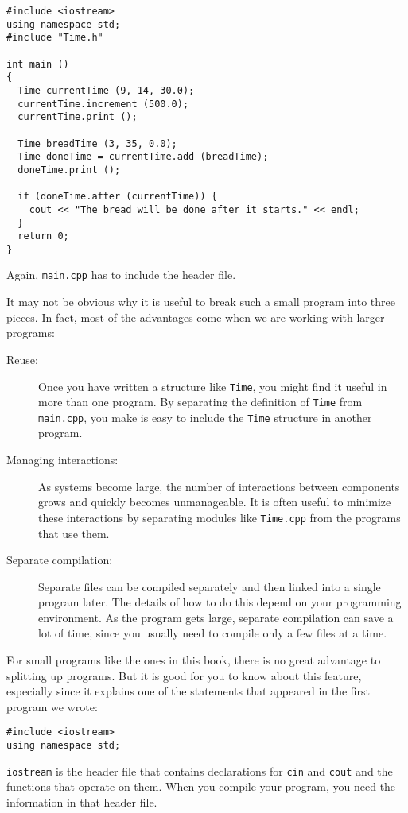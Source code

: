 \begin{verbatim}
#include <iostream>
using namespace std;
#include "Time.h"

int main ()
{
  Time currentTime (9, 14, 30.0);
  currentTime.increment (500.0);
  currentTime.print ();

  Time breadTime (3, 35, 0.0);
  Time doneTime = currentTime.add (breadTime);
  doneTime.print ();

  if (doneTime.after (currentTime)) {
    cout << "The bread will be done after it starts." << endl;
  }
  return 0;
}

\end{verbatim}
%
Again, {\tt main.cpp} has to include the header file.

It may not be obvious why it is useful to break such a small
program into three pieces.  In fact, most of the advantages come
when we are working with larger programs:

\begin{description}

\item[Reuse:]  Once you have written a structure like {\tt Time},
you might find it useful in more than one program.  By separating
the definition of {\tt Time} from {\tt main.cpp}, you make is easy
to include the {\tt Time} structure in another program.

\item[Managing interactions:]  As systems become large, the number
of interactions between components grows and quickly becomes
unmanageable.  It is often useful to minimize these interactions
by separating modules like {\tt Time.cpp} from the programs that
use them.

\item[Separate compilation:]  Separate files can be compiled
separately and then linked into a single program later.  The details
of how to do this depend on your programming environment.  As
the program gets large, separate compilation can save a lot of time,
since you usually need to compile only a few files at a time.

\end{description}

For small programs like the ones in this book, there is
no great advantage to splitting up programs.  But it is good
for you to know about this feature, especially since it explains
one of the statements that appeared in the first program we
wrote:

\begin{verbatim}
#include <iostream>
using namespace std;
\end{verbatim}
%
{\tt iostream} is the header file that contains declarations
for {\tt cin} and {\tt cout} and the functions that operate on
them.  When you compile your program, you need the information
in that header file.

